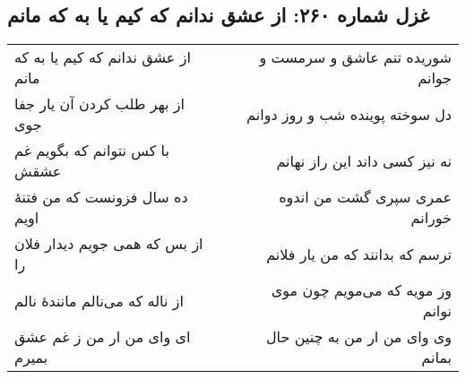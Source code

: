 \begin{center}
\section*{غزل شماره ۲۶۰: از عشق ندانم که کیم یا به که مانم}
\label{sec:260}
\begin{longtable}{l p{0.5cm} r}
از عشق ندانم که کیم یا به که مانم
&&
شوریده تنم عاشق و سرمست و جوانم
\\
از بهر طلب کردن آن یار جفا جوی
&&
دل سوخته پوینده شب و روز دوانم
\\
با کس نتوانم که بگویم غم عشقش
&&
نه نیز کسی داند این راز نهانم
\\
ده سال فزونست که من فتنهٔ اویم
&&
عمری سپری گشت من اندوه خورانم
\\
از بس که همی جویم دیدار فلان را
&&
ترسم که بدانند که من یار فلانم
\\
از ناله که می‌نالم مانندهٔ نالم
&&
وز مویه که می‌مویم چون موی نوانم
\\
ای وای من ار من ز غم عشق بمیرم
&&
وی وای من ار من به چنین حال بمانم
\\
\end{longtable}
\end{center}
